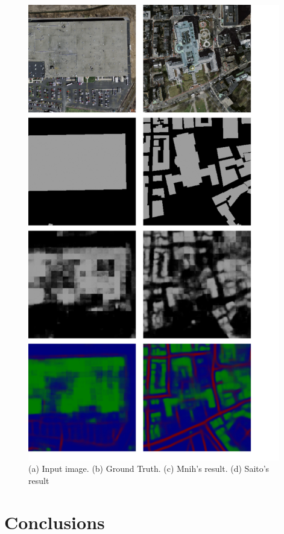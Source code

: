\documentclass[runningheads]{llncs}
\begin{document}
\begin{figure}
\centering
\includegraphics[width=110mm]{ComparedResults}
\caption{(a) Input image. (b) Ground Truth. (c) Mnih's result. (d) Saito's result}
\label{fig:BadResults}
\end{figure}

\section{Conclusions}





\end{document}
